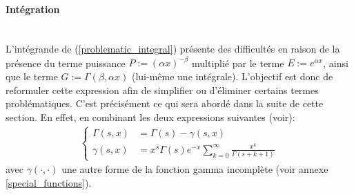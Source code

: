 \paragraph{Intégration}\phantom{}\\
L'intégrande de (\ref{problematic_integral}) présente des difficultés en raison de la présence du terme puissance $P:={(\alpha x)}^{-\beta}$ multiplié par le terme $E:=e^{\alpha x}$, ainsi que le terme $G:=\Gamma(\beta, \alpha x)$ (lui-même une intégrale). L'objectif est donc de reformuler cette expression afin de simplifier ou d'éliminer certains termes problématiques. C'est précisément ce qui sera abordé dans la suite de cette section. En effet, en combinant les deux expressions suivantes (voir\cite{NIST:DLMF}): 
\begin{align*}
    \left\{
    \begin{aligned}
        \Gamma(s,x) &= \Gamma(s)-\gamma(s,x) \\
        \gamma(s,x) &= x^s\Gamma(s)e^{-x}\sum_{k=0}^{\infty} \frac{x^k}{\Gamma(s+k+1)}
    \end{aligned}
    \right.
\end{align*}
avec $\gamma(\cdot,\cdot)$ une autre forme de la fonction gamma incomplète (voir annexe \ref{special_functions}). 


